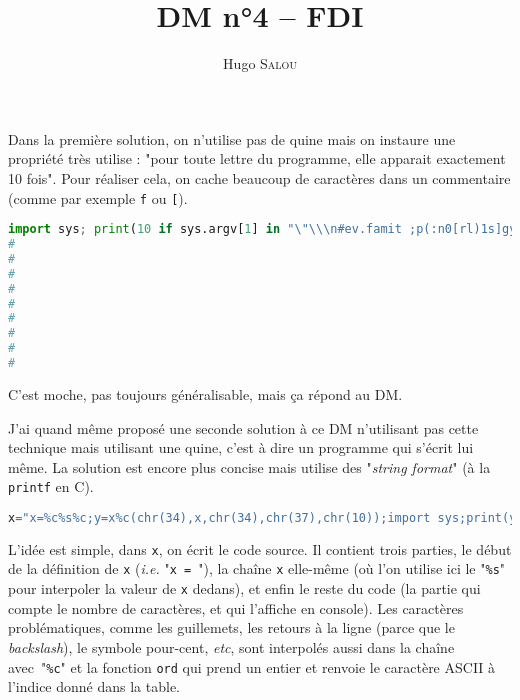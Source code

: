 \documentclass{../../notes}
\title{DM n°4 -- FDI}
\author{Hugo \scshape Salou}
\begin{document}
  \maketitle

  Dans la première solution, on n'utilise pas de quine mais on instaure une propriété très utilise : "pour toute lettre du programme, elle apparait exactement 10 fois". Pour réaliser cela, on cache beaucoup de caractères dans un commentaire (comme par exemple \texttt{f} ou \texttt{[}).

  \begin{lstlisting}[language=Python,caption=Solution sans quine au DM 4,breaklines=true,postbreak=\mbox{\textcolor{deepblue}{$\hookrightarrow$}\space}]
import sys; print(10 if sys.argv[1] in "\"\\\n#ev.famit ;p(:n0[rl)1s]gyo" else 0) #eeeeeeevvvvvvvv........ffffffffaaaaaaaammmmmmmmiiiiitttttttppppppp\\\\\\((((((((:::::::::"""""""nnnnnn0000000[[[[[[[[rrrrrr;;;;;;;;llllllll))))))))1111111ssss]]]]]]]]ggggggggyyyyyyyoooooooo
#
#
#
#
#
#
#
#
#
  \end{lstlisting}
  C'est moche, pas toujours généralisable, mais ça répond au DM.

  J'ai quand même proposé une seconde solution à ce DM n'utilisant pas cette technique mais utilisant une quine, c'est à dire un programme qui s'écrit lui même.
  La solution est encore plus concise mais utilise des "\textit{string format}" (à la \texttt{printf} en C).

  \begin{lstlisting}[language=Python,caption=Solution avec quine au DM 4, breaklines=true, postbreak=\mbox{\textcolor{deepblue}{$\hookrightarrow$}\space}]
x="x=%c%s%c;y=x%c(chr(34),x,chr(34),chr(37),chr(10));import sys;print(y.count(sys.argv[1]))%c";y=x%(chr(34),x,chr(34),chr(37),chr(10));import sys;print(y.count(sys.argv[1]))
  \end{lstlisting}

  L'idée est simple, dans \texttt{x}, on écrit le code source.
  Il contient trois parties, le début de la définition de \texttt{x} (\textit{i.e.} "\texttt{x = }"), la chaîne \texttt{x} elle-même (où l'on utilise ici le "\texttt{\%s}" pour interpoler la valeur de \texttt{x} dedans), et enfin le reste du code (la partie qui compte le nombre de caractères, et qui l'affiche en console).
  Les caractères problématiques, comme les guillemets, les retours à la ligne (parce que le \textit{backslash}), le symbole pour-cent, \textit{etc}, sont interpolés aussi dans la chaîne avec~"\texttt{\%c}" et la fonction \texttt{ord} qui prend un entier et renvoie le caractère ASCII à l'indice donné dans la table.
\end{document}
